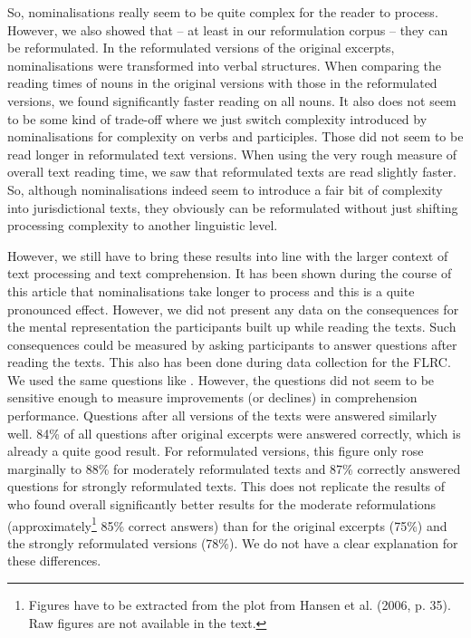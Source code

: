 \documentclass[output=paper]{langsci/langscibook}
\begin{document}
So, nominalisations really seem to be quite complex for the reader to process. However, we also showed that – at least in our reformulation corpus – they can be reformulated. In the reformulated versions of the original excerpts, nominalisations were transformed into verbal structures. When comparing the reading times of nouns in the original versions with those in the reformulated versions, we found significantly faster reading on all nouns. It also does not seem to be some kind of trade-off where we just switch complexity introduced by nominalisations for complexity on verbs and participles. Those did not seem to be read longer in reformulated text versions. When using the very rough measure of overall text reading time, we saw that reformulated texts are read slightly faster. So, although nominalisations indeed seem to introduce a fair bit of complexity into jurisdictional texts, they obviously can be reformulated without just shifting processing complexity to another linguistic level.

However, we still have to bring these results into line with the larger context of text processing and text comprehension. It has been shown during the course of this article that nominalisations take longer to process and this is a quite pronounced effect. However, we did not present any data on the consequences for the mental representation the participants built up while reading the texts. Such consequences could be measured by asking participants to answer questions after reading the texts. This also has been done during data collection for the FLRC. We used the same questions like \citet{HansenEtAl2006}. However, the questions did not seem to be sensitive enough to measure improvements (or declines) in comprehension performance. Questions after all versions of the texts were answered similarly well. 84\% of all questions after original excerpts were answered correctly, which is already a quite good result. For reformulated versions, this figure only rose marginally to 88\% for moderately reformulated texts and 87\% correctly answered questions for strongly reformulated texts. This does not replicate the results of \citet{HansenEtAl2006} who found overall significantly better results for the moderate reformulations (approximately\footnote{Figures have to be extracted from the plot from Hansen et al. (2006, p. 35). Raw figures are not available in the text. } 85\% correct answers) than for the original excerpts (75\%) and the strongly reformulated versions (78\%). We do not have a clear explanation for these differences.
\end{document}
